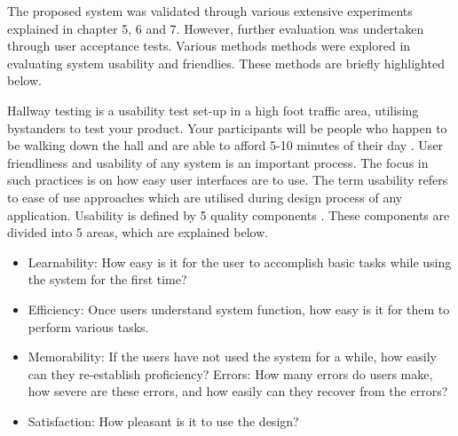 The proposed system was validated through various extensive experiments explained in chapter 5, 6 and 7. However, further evaluation was undertaken through user acceptance tests. Various methods methods were explored in evaluating system usability and friendlies. These methods are briefly highlighted below.

Hallway testing is a usability test set-up in a high foot traffic area, utilising bystanders to test your product. Your participants will be people who happen to be walking down the hall and are able to afford 5-10 minutes of their day \cite{hallway}. User friendliness and usability of any system is an important process. The focus in such practices is on how easy user interfaces are to use. The term usability refers to ease of use approaches which are utilised during design process of any application. Usability is defined by 5 quality components \cite{nielsen1994usability}. These components are divided into 5 areas, which are explained below.

\begin{itemize}
\item 
Learnability: How easy is it for the user to accomplish basic tasks while using the system for the first time? 
\item	Efficiency: Once users understand system function, how easy is it for them to perform various tasks.
\item Memorability: If the users have not used the system for a while, how easily can they re-establish proficiency?
\itme Errors: How many errors do users make, how severe are these errors, and how easily can they recover from the errors?
\item Satisfaction: How pleasant is it to use the design?

\end{itemize}

